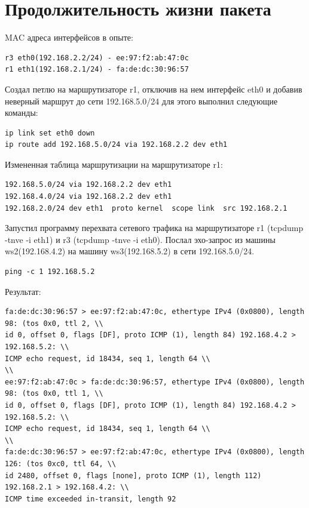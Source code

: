 \documentclass[a4paper,12pt]{article}
\begin{document}
\section{Продолжительность жизни пакета}

MAC адреса интерфейсов в опыте:
\begin{Verbatim}
r3 eth0(192.168.2.2/24) - ee:97:f2:ab:47:0c
r1 eth1(192.168.2.1/24) - fa:de:dc:30:96:57
\end{Verbatim}

Создал петлю на маршрутизаторе r1, отключив на нем интерфейс eth0 и добавив неверный маршрут до сети 192.168.5.0/24 для этого выполнил следующие команды: 
\begin{Verbatim}
ip link set eth0 down
ip route add 192.168.5.0/24 via 192.168.2.2 dev eth1
\end{Verbatim}

Измененная таблица маршрутизации на маршрутизаторе r1:
\begin{Verbatim}
192.168.5.0/24 via 192.168.2.2 dev eth1 
192.168.4.0/24 via 192.168.2.2 dev eth1 
192.168.2.0/24 dev eth1  proto kernel  scope link  src 192.168.2.1
\end{Verbatim}

Запустил программу перехвата сетевого трафика на маршрутизаторе r1 (tcpdump -tnve -i eth1) и r3 (tcpdump -tnve -i eth0). Послал эхо-запрос из машины ws2(192.168.4.2) на машину ws3(192.168.5.2) в сети 192.168.5.0/24.
\begin{Verbatim}
ping -c 1 192.168.5.2
\end{Verbatim}

Результат:

\begin{Verbatim}
fa:de:dc:30:96:57 > ee:97:f2:ab:47:0c, ethertype IPv4 (0x0800), length 98: (tos 0x0, ttl 2, \\ 
id 0, offset 0, flags [DF], proto ICMP (1), length 84) 192.168.4.2 > 192.168.5.2: \\
ICMP echo request, id 18434, seq 1, length 64 \\
\\
ee:97:f2:ab:47:0c > fa:de:dc:30:96:57, ethertype IPv4 (0x0800), length 98: (tos 0x0, ttl 1, \\ 
id 0, offset 0, flags [DF], proto ICMP (1), length 84) 192.168.4.2 > 192.168.5.2: \\
ICMP echo request, id 18434, seq 1, length 64 \\
\\
fa:de:dc:30:96:57 > ee:97:f2:ab:47:0c, ethertype IPv4 (0x0800), length 126: (tos 0xc0, ttl 64, \\
id 2480, offset 0, flags [none], proto ICMP (1), length 112) 192.168.2.1 > 192.168.4.2: \\
ICMP time exceeded in-transit, length 92
\end{Verbatim}
\end{document}
